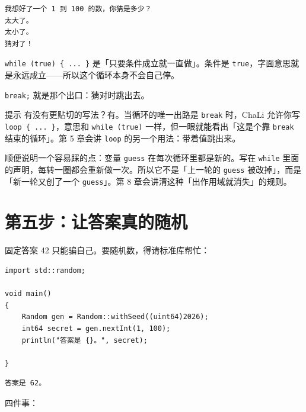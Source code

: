 \par
\medskip
\begin{lstlisting}[style=out]
我想好了一个 1 到 100 的数，你猜是多少？
太大了。
太小了。
猜对了！
\end{lstlisting}
\par
\medskip

\texttt{while (\allowbreak{}true)\allowbreak{} \{ .\allowbreak{}.\allowbreak{}.\allowbreak{} \}} 是「只要条件成立就一直做」。条件是 \texttt{true}，字面意思就是永远成立——所以这个循环本身不会自己停。

\texttt{break;} 就是那个出口：猜对时跳出去。

\begin{tip}{提示}
有没有更贴切的写法？有。当循环的唯一出路是 \texttt{break} 时，ChaLi 允许你写\texttt{loop \{ .\allowbreak{}.\allowbreak{}.\allowbreak{} \}}，意思和 \texttt{while (\allowbreak{}true)\allowbreak{}} 一样，但一眼就能看出「这是个靠 \texttt{break} 结束的循环」。第 5 章会讲 \texttt{loop} 的另一个用法：带着值跳出来。
\end{tip}

顺便说明一个容易踩的点：变量 \texttt{guess} 在每次循环里都是新的。写在 \texttt{while} 里面的声明，每转一圈都会重新做一次。所以它不是「上一轮的 \texttt{guess} 被改掉」，而是「新一轮又创了一个 \texttt{guess}」。第 8 章会讲清这种「出作用域就消失」的规则。

\section{第五步：让答案真的随机}

固定答案 42 只能骗自己。要随机数，得请标准库帮忙：

\par
\medskip
\begin{lstlisting}[style=chali]
import std::random;

void main()
{
    Random gen = Random::withSeed((uint64)2026);
    int64 secret = gen.nextInt(1, 100);
    println("答案是 {}。", secret);

}
\end{lstlisting}
\par
\medskip

\par
\medskip
\begin{lstlisting}[style=out]
答案是 62。
\end{lstlisting}
\par
\medskip

四件事：

